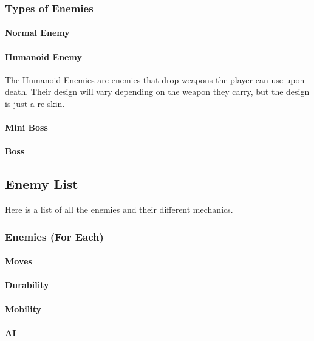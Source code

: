 \documentclass[12pt]{article}
\begin{document}
\subsubsection{Types of Enemies}

\paragraph{Normal Enemy}

\paragraph{Humanoid Enemy}

The Humanoid Enemies are enemies that drop weapons the player can use upon death. Their design will vary depending on the weapon they carry, but the design is just a re-skin. 

\paragraph{Mini Boss}

\paragraph{Boss}

\subsection{Enemy List}

Here is a list of all the enemies and their different mechanics. 

\subsubsection{Enemies (For Each)}

\paragraph{Moves}

\paragraph{Durability}

\paragraph{Mobility}

\paragraph{AI}
\end{document}
